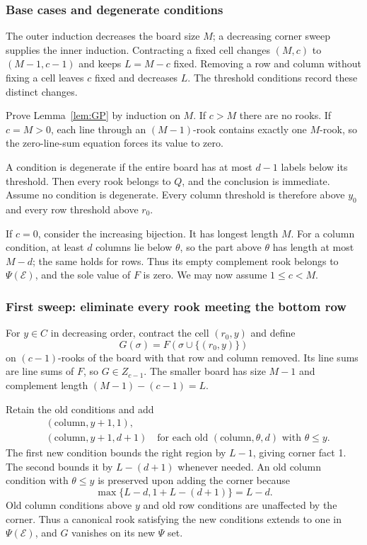 \subsubsection{Base cases and degenerate conditions}
The outer induction decreases the board size $M$; a decreasing corner
sweep supplies the inner induction. Contracting a fixed cell changes
$(M,c)$ to $(M-1,c-1)$ and keeps $L=M-c$ fixed. Removing a row and
column without fixing a cell leaves $c$ fixed and decreases $L$.
The threshold conditions record these distinct changes.

Prove Lemma~\ref{lem:GP} by induction on $M$. If $c>M$ there are no rooks. If $c=M>0$, each line through an $(M-1)$-rook contains exactly one $M$-rook, so the zero-line-sum equation forces its value to zero.

A condition is degenerate if the entire board has at most $d-1$ labels below its threshold. Then every rook belongs to $Q$, and the conclusion is immediate. Assume no condition is degenerate. Every column threshold is therefore above $y_0$ and every row threshold above $r_0$.

If $c=0$, consider the increasing bijection. It has longest length $M$. For a column condition, at least $d$ columns lie below $\theta$, so the part above $\theta$ has length at most $M-d$; the same holds for rows. Thus its empty complement rook belongs to $\Psi(\mathcal E)$, and the sole value of $F$ is zero. We may now assume $1\le c<M$.

\subsubsection{First sweep: eliminate every rook meeting the bottom row}
For $y\in C$ in decreasing order, contract the cell $(r_0,y)$ and define
\[G(\sigma)=F(\sigma\cup\{(r_0,y)\})
\]
on $(c-1)$-rooks of the board with that row and column removed. Its line sums are line sums of $F$, so $G\in Z_{c-1}$. The smaller board has size $M-1$ and complement length $(M-1)-(c-1)=L$.

Retain the old conditions and add
\begin{align*}
&(\mathrm{column},y+1,1),\\
&(\mathrm{column},y+1,d+1)
\quad\text{for each old }(\mathrm{column},\theta,d)\text{ with }\theta\le y.
\end{align*}
The first new condition bounds the right region by $L-1$, giving corner fact 1. The second bounds it by $L-(d+1)$ whenever needed. An old column condition with $\theta\le y$ is preserved upon adding the corner because
\[\max\{L-d,1+L-(d+1)\}=L-d.
\]
Old column conditions above $y$ and old row conditions are unaffected by the corner. Thus a canonical rook satisfying the new conditions extends to one in $\Psi(\mathcal E)$, and $G$ vanishes on its new $\Psi$ set.

